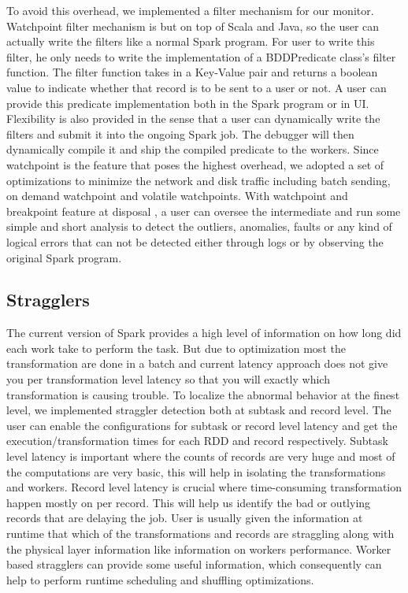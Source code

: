 \documentclass{acm_proc_article-sp}
\begin{document}
To avoid this overhead, we implemented a filter mechanism for our monitor. Watchpoint filter mechanism is but on top of Scala and Java, so the user can actually write the filters like a normal Spark program.  For user to write this filter, he only needs to write the implementation of a BDDPredicate class's filter function. The filter function takes in a Key-Value pair and returns a boolean value to indicate whether that record is to be sent to a user or not. A user can provide this predicate implementation both in the Spark program or in UI.  Flexibility is also provided in the sense that a user can dynamically write the filters and submit it into the ongoing Spark job. The debugger will then dynamically compile it and ship the compiled predicate to the workers. Since watchpoint is the feature that poses the highest overhead, we adopted a set of optimizations to minimize the network and disk traffic including batch sending, on demand watchpoint and volatile watchpoints. With watchpoint and breakpoint feature at disposal , a user can oversee the intermediate and run some simple and short analysis to detect the outliers, anomalies, faults or any kind of logical errors that can not be detected either through logs or by observing the original Spark program. 

 
\subsection{Stragglers}

The current version of Spark provides a high level of information on how long did each work take to perform the task. But due to optimization most the transformation are done in a batch and current latency approach does not give you per transformation level latency so that you will exactly which transformation is causing trouble. To localize the abnormal behavior at the finest level, we implemented straggler detection both at subtask and record level. The user can enable the configurations for subtask or record level latency and get the execution/transformation times for each RDD and record respectively. Subtask level latency is important where the counts of records are very huge and most of the computations are very basic, this will help in isolating the transformations and workers. Record level latency is crucial where time-consuming transformation happen mostly on per record. This will help us identify the bad or outlying records that are delaying the job. User is usually given the information at runtime that which of the transformations and records are straggling along with the physical layer information like information on workers performance. Worker based stragglers can provide some useful information, which consequently can help to perform runtime scheduling and shuffling optimizations.
\end{document}
